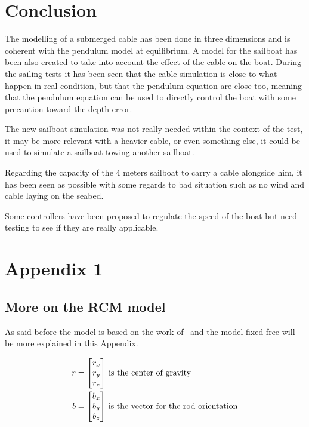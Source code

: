 \documentclass[twoside,12pt]{report} %
\begin{document}
\chapter*{Conclusion}

The modelling of a submerged cable has been done in three dimensions and is coherent with the pendulum model at equilibrium. A model for the sailboat has been also created to take into account the effect of the cable on the boat.
During the sailing tests it has been seen that the cable simulation is close to what happen in real condition, but that the pendulum equation are close too, meaning that the pendulum equation can be used to directly control the boat with some precaution toward the depth error.

The new sailboat simulation was not really needed within the context of the test, it may be more relevant with a heavier cable, or even something else, it could be used to simulate a sailboat towing another sailboat.

Regarding the capacity of the 4 meters sailboat to carry a cable alongside him, it has been seen as possible with some regards to bad situation such as no wind and cable laying on the seabed.

Some controllers have been proposed to regulate the speed of the boat but need testing to see if they are really applicable.


{
\printglossaries
}
\chapter*{Appendix 1} 
\label{chap:RCM_model}

\section*{More on the RCM model} 
As said before the model is based on the work of~\cite{johansen2007modelling} and the model fixed-free will be more explained in this Appendix.

\begin{align}
r &= \begin{bmatrix}
    r_x \\
    r_y \\
    r_z
\end{bmatrix}\, \textnormal{is the center of gravity}\\
b &= \begin{bmatrix}
    b_x \\
    b_y \\
    b_z
\end{bmatrix}\, \textnormal{is the vector for the rod orientation} 
\end{align}
\end{document}
